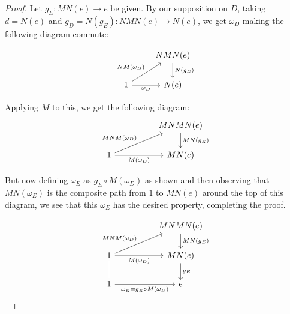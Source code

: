 \begin{proof}
Let $g_E : MN(e) \to e$ be given. By our supposition on $D$, taking $d = N(e)$ and $g_D = N(g_E) : NMN(e) \to N(e)$, we get $\omega_D$ making the following diagram commute:

\[\begin{tikzcd}
	& {NMN(e)} \\
	1 & {N(e)}
	\arrow["{NM(\omega_D)}", from=2-1, to=1-2]
	\arrow["{N(g_E)}", from=1-2, to=2-2]
	\arrow["{\omega_D}"', from=2-1, to=2-2]
\end{tikzcd}\]

Applying $M$ to this, we get the following diagram:
\[\begin{tikzcd}
	&& {MNMN(e)} \\
	1 && {MN(e)}
	\arrow["{MNM(\omega_D)}", from=2-1, to=1-3]
	\arrow["{MN(g_E)}", from=1-3, to=2-3]
	\arrow["{M(\omega_D)}"', from=2-1, to=2-3]
\end{tikzcd}\]

But now defining $\omega_E$ as $g_E \circ M(\omega_D)$ as shown and then observing that $MN(\omega_E)$ is the composite path from $1$ to $MN(e)$ around the top of this diagram, we see that this $\omega_E$ has the desired property, completing the proof.

\[\begin{tikzcd}
	&& {MNMN(e)} \\
	1 && {MN(e)} \\
	1 && e
	\arrow["{MNM(\omega_D)}", from=2-1, to=1-3]
	\arrow["{MN(g_E)}", from=1-3, to=2-3]
	\arrow["{M(\omega_D)}"', from=2-1, to=2-3]
	\arrow["{g_E}", from=2-3, to=3-3]
	\arrow["{\omega_E = g_E \circ M(\omega_D)}"', from=3-1, to=3-3]
	\arrow[Rightarrow, no head, from=2-1, to=3-1]
\end{tikzcd}\]
\end{proof}


